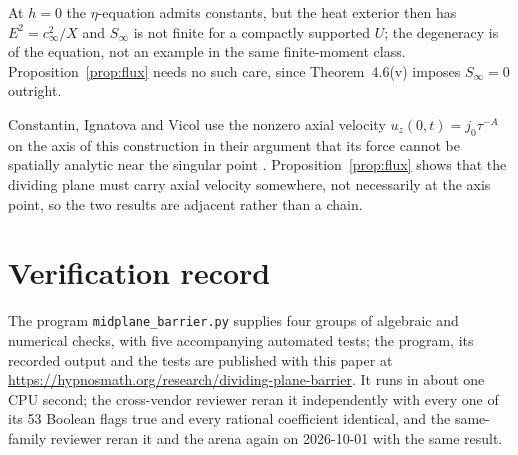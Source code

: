 \documentclass[11pt]{article}
\begin{document}
\begin{remark}\label{rem:h0}
At $h=0$ the $\eta$-equation admits constants, but the heat exterior then has $E^2=c_\infty^2/X$ and $S_\infty$ is not finite for a compactly supported $U$; the degeneracy is of the equation, not an example in the same finite-moment class. Proposition~\ref{prop:flux} needs no such care, since Theorem~4.6(v) imposes $S_\infty=0$ outright.
\end{remark}

\begin{remark}[adjacency]\label{rem:indep}
Constantin, Ignatova and Vicol use the nonzero axial velocity $u_z(0,t)=j_0\tau^{-A}$ on the axis of this construction in their argument that its force cannot be spatially analytic near the singular point \cite[Remark~2.6 and footnote~9, p.~11]{CIV}. Proposition~\ref{prop:flux} shows that the dividing plane must carry axial velocity somewhere, not necessarily at the axis point, so the two results are adjacent rather than a chain.
\end{remark}

\section{Verification record}\label{sec:verification}

The program \texttt{midplane\_barrier.py} supplies four groups of algebraic and numerical checks, with five accompanying automated tests; the program, its recorded output and the tests are published with this paper at \url{https://hypnosmath.org/research/dividing-plane-barrier}. It runs in about one CPU second; the cross-vendor reviewer reran it independently with every one of its 53 Boolean flags true and every rational coefficient identical, and the same-family reviewer reran it and the arena again on 2026-10-01 with the same result.
\end{document}
